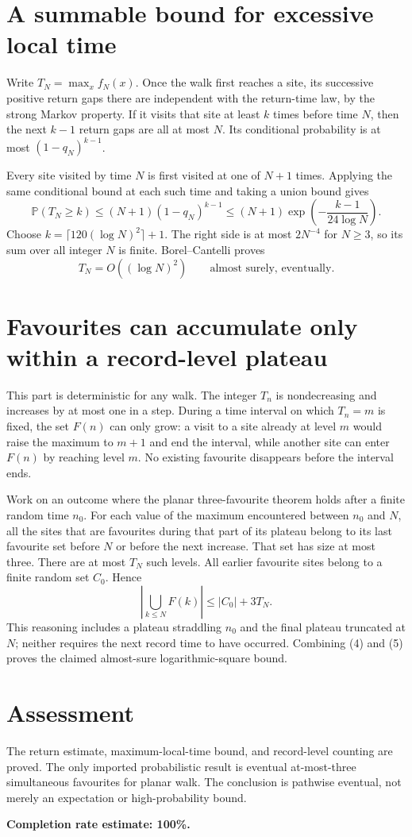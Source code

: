 \documentclass[11pt]{article}
\begin{document}
\section*{A summable bound for excessive local time}
Write $T_N=\max_x f_N(x)$. Once the walk first reaches a site, its successive positive return gaps there are independent with the return-time law, by the strong Markov property. If it visits that site at least $k$ times before time $N$, then the next $k-1$ return gaps are all at most $N$. Its conditional probability is at most $(1-q_N)^{k-1}$.

Every site visited by time $N$ is first visited at one of $N+1$ times. Applying the same conditional bound at each such time and taking a union bound gives
\[
 \mathbb P(T_N\ge k)\le(N+1)(1-q_N)^{k-1}
 \le(N+1)\exp\left(-\frac{k-1}{24\log N}\right).
\tag{3}
\]
Choose $k=\lceil120(\log N)^2\rceil+1$. The right side is at most $2N^{-4}$ for $N\ge3$, so its sum over all integer $N$ is finite. Borel--Cantelli proves
\[
 T_N=O((\log N)^2)\qquad\text{almost surely, eventually}.\tag{4}
\]

\section*{Favourites can accumulate only within a record-level plateau}
This part is deterministic for any walk. The integer $T_n$ is nondecreasing and increases by at most one in a step. During a time interval on which $T_n=m$ is fixed, the set $F(n)$ can only grow: a visit to a site already at level $m$ would raise the maximum to $m+1$ and end the interval, while another site can enter $F(n)$ by reaching level $m$. No existing favourite disappears before the interval ends.

Work on an outcome where the planar three-favourite theorem holds after a finite random time $n_0$. For each value of the maximum encountered between $n_0$ and $N$, all the sites that are favourites during that part of its plateau belong to its last favourite set before $N$ or before the next increase. That set has size at most three. There are at most $T_N$ such levels. All earlier favourite sites belong to a finite random set $C_0$. Hence
\[
 \left|\bigcup_{k\le N}F(k)\right|\le |C_0|+3T_N.
\tag{5}
\]
This reasoning includes a plateau straddling $n_0$ and the final plateau truncated at $N$; neither requires the next record time to have occurred. Combining (4) and (5) proves the claimed almost-sure logarithmic-square bound.

\section*{Assessment}
The return estimate, maximum-local-time bound, and record-level counting are proved. The only imported probabilistic result is eventual at-most-three simultaneous favourites for planar walk. The conclusion is pathwise eventual, not merely an expectation or high-probability bound.

\textbf{Completion rate estimate: 100\%.}
\end{document}
